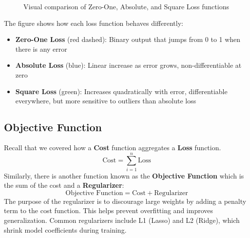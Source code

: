 \begin{figure}[h]
\centering
{}
\caption{Visual comparison of Zero-One, Absolute, and Square Loss functions}
\label{fig:loss-comparison}
\end{figure}

The figure shows how each loss function behaves differently:
\begin{itemize}
    \item \textbf{Zero-One Loss} (red dashed): Binary output that jumps from 0 to 1 when there is any error
    \item \textbf{Absolute Loss} (blue): Linear increase as error grows, non-differentiable at zero
    \item \textbf{Square Loss} (green): Increases quadratically with error, differentiable everywhere, but more sensitive to outliers than absolute loss
\end{itemize}

\subsection{Objective Function}
Recall that we covered how a \textbf{Cost} function aggregates a \textbf{Loss} function.
\[ 
\text{Cost}=\sum_{i=1}^{n} \text{Loss}
\]
Similarly, there is another function known as the \textbf{Objective Function} which is the sum of the cost and a \textbf{Regularizer}:
\[ 
\text{Objective Function}=\text{Cost} + \text{Regularizer}
\]
The purpose of the regularizer is to discourage large weights by adding a penalty term to the cost function. This helps prevent overfitting and improves generalization. Common regularizers include L1 (Lasso) and L2 (Ridge), which shrink model coefficients during training.

